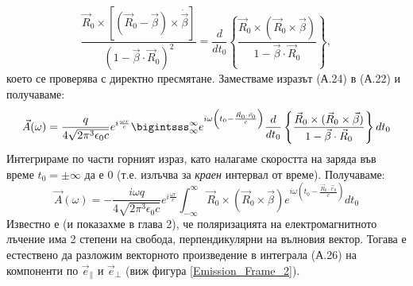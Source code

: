 \begin{appendices}
\begin{equation}
	\frac{\vec{R}_0 \times \left[\left(\vec{R}_0 - \vec{\beta}\right)\times\dot{\vec{\beta}}\right]}{(1 - \vec{\beta}\cdot\vec{R}_0)^2} = \frac{d}{dt_0}\left\{\frac{\vec{R}_0\times(\vec{R}_0\times\vec{\beta})}{1 - \vec{\beta}\cdot\vec{R}_0}\right\},
\end{equation}
което се проверява с директно пресмятане. Заместваме изразът (А.24) в (А.22) и получаваме:
\begin{eqnarray}
	\vec{A}(\omega) = \frac{q}{4\sqrt{2\pi^3\epsilon_0 c}}e^{i\frac{\omega r}{c}}\bigintsss_\infty^\infty e^{i\omega\left(t_0 - \frac{\vec{R}_0\cdot\vec{r}_0}{c}\right)}\frac{d}{dt_0}\left\{\frac{\vec{R}_0\times(\vec{R}_0\times\vec{\beta})}{1 - \vec{\beta}\cdot\vec{R}_0}\right\}dt_0
\end{eqnarray}
Интегрираме по части горният израз, като налагаме скоростта на заряда във време $t_0 = \pm\infty$ да е 0 (т.е. излъчва за \emph{краен} интервал от време). Получаваме:
\begin{equation}
	\vec{A}(\omega) = -\frac{i\omega q}{4\sqrt{2\pi^3\epsilon_0 c}}e^{i\frac{\omega r}{c}}\int_{-\infty}^\infty\vec{R}_0\times(\vec{R}_0\times\vec{\beta})e^{i\omega\left(t_0 - \frac{\vec{R}_0\cdot\vec{r}_0}{c}\right)} dt_0
\end{equation}
Известно е (и показахме в глава 2), че поляризацията на електромагнитното лъчение има 2 степени на свобода, перпендикулярни на вълновия вектор. Тогава е естествено да разложим векторното произведение в интеграла (А.26) на компоненти по $\vec{e}_{\parallel}$ и $\vec{e}_{\perp}$ (виж фигура \ref{Emission_Frame_2}).\\
\begin{minipage}{16em}
	
\end{minipage}
\end{appendices}
